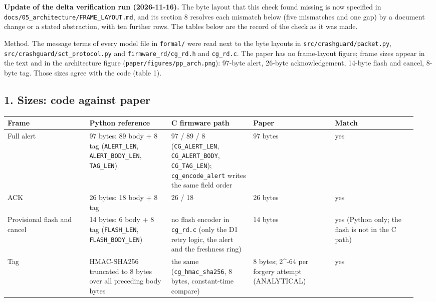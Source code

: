 


\textbf{Update of the delta verification run (2026-11-16).} The byte layout that this check found missing is now specified in \texttt{docs/05\_architecture/FRAME\_LAYOUT.md}, and its section 8 resolves each mismatch below (five mismatches and one gap) by a document change or a stated abstraction, with ten further rows. The tables below are the record of the check as it was made.

Method. The message terms of every model file in \texttt{formal/} were read next to the byte layouts in \texttt{src/crashguard/packet.py}, \texttt{src/crashguard/sct\_protocol.py} and \texttt{firmware\_rd/cg\_rd.h} and \texttt{cg\_rd.c}. The paper has no frame-layout figure; frame sizes appear in the text and in the architecture figure (\texttt{paper/figures/pp\_arch.png}): 97-byte alert, 26-byte acknowledgement, 14-byte flash and cancel, 8-byte tag. Those sizes agree with the code (table 1).

\subsection*{1. Sizes: code against paper}

{\scriptsize\raggedright
\begin{longtable}{p{0.190\linewidth}p{0.190\linewidth}p{0.190\linewidth}p{0.190\linewidth}p{0.190\linewidth}}
\toprule
Frame & Python reference & C firmware path & Paper & Match \\
\midrule
\endhead
Full alert & 97 bytes: 89 body + 8 tag (\texttt{ALERT\_LEN}, \texttt{ALERT\_BODY\_LEN}, \texttt{TAG\_LEN}) & 97 / 89 / 8 (\texttt{CG\_ALERT\_LEN}, \texttt{CG\_ALERT\_BODY}, \texttt{CG\_TAG\_LEN}); \texttt{cg\_encode\_alert} writes the same field order & 97 bytes & yes \\
ACK & 26 bytes: 18 body + 8 tag & 26 / 18 & 26 bytes & yes \\
Provisional flash and cancel & 14 bytes: 6 body + 8 tag (\texttt{FLASH\_LEN}, \texttt{FLASH\_BODY\_LEN}) & no flash encoder in \texttt{cg\_rd.c} (only the D1 retry logic, the alert and the freshness ring) & 14 bytes & yes (Python only; the flash is not in the C path) \\
Tag & HMAC-SHA256 truncated to 8 bytes over all preceding body bytes & the same (\texttt{cg\_hmac\_sha256}, 8 bytes, constant-time compare) & 8 bytes; 2\textasciicircum{}-64 per forgery attempt (ANALYTICAL) & yes \\
\bottomrule
\end{longtable}}

